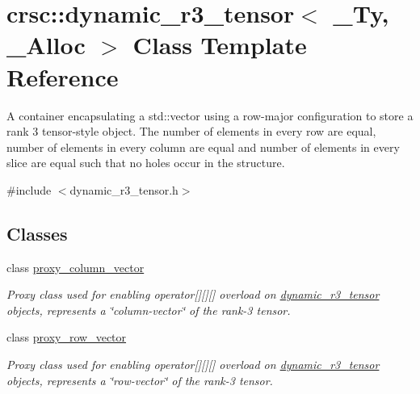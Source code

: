 \hypertarget{classcrsc_1_1dynamic__r3__tensor}{}\section{crsc\+:\+:dynamic\+\_\+r3\+\_\+tensor$<$ \+\_\+\+Ty, \+\_\+\+Alloc $>$ Class Template Reference}
\label{classcrsc_1_1dynamic__r3__tensor}


A container encapsulating a {\ttfamily std\+::vector} using a row-\/major configuration to store a rank 3 tensor-\/style object. The number of elements in every row are equal, number of elements in every column are equal and number of elements in every slice are equal such that no holes occur in the structure.  




{\ttfamily \#include $<$dynamic\+\_\+r3\+\_\+tensor.\+h$>$}

\subsection*{Classes}
\begin{DoxyCompactItemize}
\item 
class \hyperlink{classcrsc_1_1dynamic__r3__tensor_1_1proxy__column__vector}{proxy\+\_\+column\+\_\+vector}
\begin{DoxyCompactList}\small\item\em Proxy class used for enabling operator\mbox{[}\mbox{]}\mbox{[}\mbox{]}\mbox{[}\mbox{]} overload on \hyperlink{classcrsc_1_1dynamic__r3__tensor}{dynamic\+\_\+r3\+\_\+tensor} objects, represents a \char`\"{}column-\/vector\char`\"{} of the rank-\/3 tensor. \end{DoxyCompactList}\item 
class \hyperlink{classcrsc_1_1dynamic__r3__tensor_1_1proxy__row__vector}{proxy\+\_\+row\+\_\+vector}
\begin{DoxyCompactList}\small\item\em Proxy class used for enabling operator\mbox{[}\mbox{]}\mbox{[}\mbox{]}\mbox{[}\mbox{]} overload on \hyperlink{classcrsc_1_1dynamic__r3__tensor}{dynamic\+\_\+r3\+\_\+tensor} objects, represents a \char`\"{}row-\/vector\char`\"{} of the rank-\/3 tensor. \end{DoxyCompactList}\end{DoxyCompactItemize}
